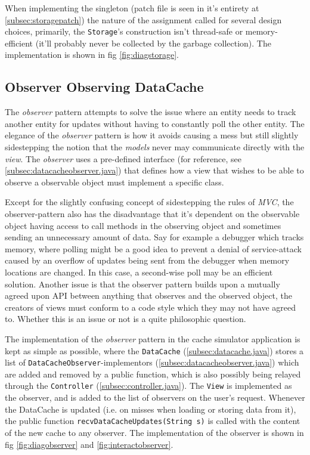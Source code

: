 \documentclass[a4paper]{scrreprt}
\begin{document}
When implementing the singleton (patch file is seen in it's entirety at \ref{subsec:storagepatch}) the nature of the assignment called for several design choices, primarily, the \texttt{Storage}'s construction isn't thread-safe or memory-efficient (it'll probably never be collected by the garbage collection). The implementation is shown in fig \ref{fig:diagstorage}.

\subsection{Observer Observing DataCache}
\label{subsec:Observer}

The \textit{observer} pattern attempts to solve the issue where an entity needs to track another entity for updates without having to constantly poll the other entity. The elegance of the \textit{observer} pattern is how it avoids causing a mess but still slightly sidestepping the notion that the \textit{models} never may communicate directly with the \textit{view}. The \textit{observer} uses a pre-defined interface (for reference, see \ref{subsec:datacacheobserver.java}) that defines how a view that wishes to be able to observe a observable object must implement a specific class.

Except for the slightly confusing concept of sidestepping the rules of \textit{MVC}, the observer-pattern also has the disadvantage that it's dependent on the observable object having access to call methods in the observing object and sometimes sending an unnecessary amount of data. Say for example a debugger which tracks memory, where polling might be a good idea to prevent a denial of service-attack caused by an overflow of updates being sent from the debugger when memory locations are changed. In this case, a second-wise poll may be an efficient solution. Another issue is that the observer pattern builds upon a mutually agreed upon API between anything that observes and the observed object, the creators of views must conform to a code style which they may not have agreed to. Whether this is an issue or not is a quite philosophic question.

The implementation of the \textit{observer} pattern in the cache simulator application is kept as simple as possible, where the \texttt{DataCache} (\ref{subsec:datacache.java}) stores a list of \texttt{DataCacheObserver}-implementors (\ref{subsec:datacacheobserver.java}) which are added and removed by a public function, which is also possibly being relayed through the \texttt{Controller} (\ref{subsec:controller.java}). The \texttt{View} is implemented as the observer, and is added to the list of observers on the user's request. Whenever the DataCache is updated (i.e. on misses when loading or storing data from it), the public function \texttt{recvDataCacheUpdates(String s)} is called with the content of the new cache to any observer. The implementation of the observer is shown in fig \ref{fig:diagobserver} and \ref{fig:interactobserver}.
\end{document}
